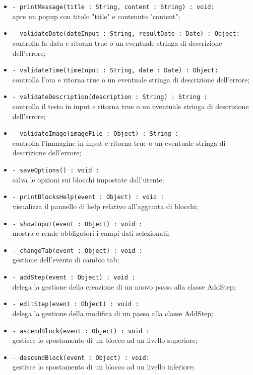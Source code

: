 \begin{flushleft}
\begin{itemize}
\begin{sloppypar}
\begin{itemize}
\item \texttt{- printMessage(title : String, content : String) : void:}\\ apre un popup con titolo "title" e contenuto "content";
\item \texttt{- validateDate(dateInput : String, resultDate : Date) : Object:}\\ controlla la data e ritorna true o un eventuale stringa di descrizione dell'errore;
\item \texttt{- validateTime(timeInput : String, date : Date) : Object:}\\ controlla l'ora e ritorna true o un eventuale stringa di descrizione dell'errore;
\item \texttt{- validateDescription(description : String) : String :}\\ controlla il testo in input e ritorna true o un eventuale stringa di descrizione dell'errore;
\item \texttt{- validateImage(imageFile : Object) : String :}\\controlla l'immagine in input e ritorna true o un eventuale stringa di descrizione dell'errore;
\item \texttt{- saveOptions() : void :}\\ salva le opzioni sui blocchi impostate dall'utente;
\item \texttt{- printBlocksHelp(event : Object) : void :}\\ visualizza il pannello di help relativo all'aggiunta di blocchi;
\item \texttt{- showInput(event : Object) : void :}\\ mostra e rende obbligatori i campi dati selezionati;
\item \texttt{- changeTab(event : Object) : void :}\\ gestione dell'evento di cambio tab;
\item \texttt{- addStep(event : Object) : void :}\\ delega la gestione della creazione di un nuovo passo alla classe AddStep;
\item \texttt{- editStep(event : Object) : void :}\\ delega la gestione della modifica di un passo alla classe AddStep;
\item \texttt{- ascendBlock(event : Object) : void :}\\ gestisce lo spostamento di un blocco ad un livello superiore;
\item \texttt{- descendBlock(event : Object) : void:}\\ gestisce lo spostamento di un blocco ad un livello inferiore;

\end{itemize}
\end{sloppypar}
\end{itemize}
\end{flushleft}

